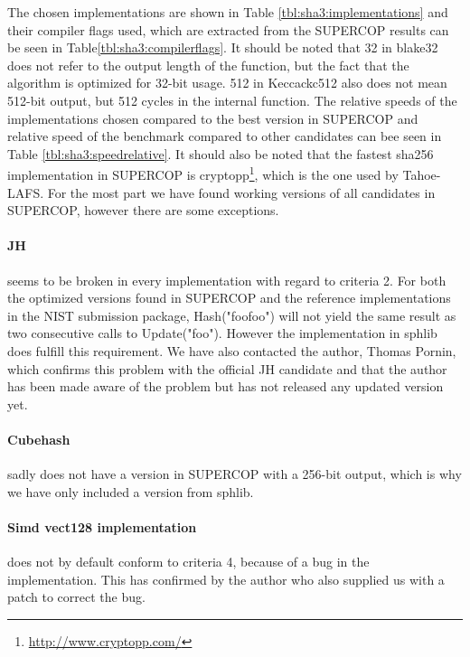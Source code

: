 \documentclass[english,12pt,a4paper]{book}
\begin{document}


The chosen implementations are shown in Table \ref{tbl:sha3:implementations}
and their compiler flags used, which are extracted from the \ac{SUPERCOP}
results can be seen in Table\ref{tbl:sha3:compilerflags}. It should be noted
that 32 in blake32 does not refer to the output length of the function, but the
fact that the algorithm is optimized for 32-bit usage. 512 in Keccackc512 also
does not mean 512-bit output, but 512 cycles in the internal function. The
relative speeds of the implementations chosen compared to the best version in
\ac{SUPERCOP} and relative speed of the benchmark compared to other candidates
can bee seen in Table \ref{tbl:sha3:speedrelative}. It should also be noted
that the fastest sha256 implementation in \ac{SUPERCOP} is
cryptopp\footnote{\url{http://www.cryptopp.com/}}, which is the one used by
Tahoe-\ac{LAFS}. For the most part we have found working versions of all
candidates in \ac{SUPERCOP}, however there are some exceptions. 





\paragraph{JH} seems to be broken in every implementation with regard to
criteria 2. For both the optimized versions found in \ac{SUPERCOP} and the
reference implementations in the \ac{NIST} submission package, Hash("foofoo")
will not yield the same result as two consecutive calls to Update("foo").
However the implementation in sphlib does fulfill this requirement. We have
also contacted the author, Thomas Pornin, which confirms this problem with the
official JH candidate and that the author has been made aware of the problem
but has not released any updated version yet.

\paragraph{Cubehash} sadly does not have a version in \ac{SUPERCOP} with a 256-bit
output, which is why we have only included a version from sphlib.

\paragraph{Simd vect128 implementation} does not by default conform to
criteria 4, because of a bug in the implementation. This has confirmed by the
author who also supplied us with a patch to correct the bug.
\end{document}
